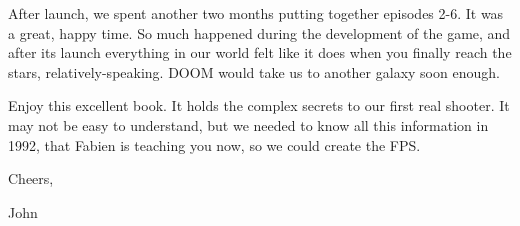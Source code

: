 \par
After launch, we spent another two months putting together episodes 2-6. It was a great, happy time. So much happened during the development of the game, and after its launch everything in our world felt like it does when you finally reach the stars, relatively-speaking. DOOM would take us to another galaxy soon enough.\\
\par
Enjoy this excellent book. It holds the complex secrets to our first real shooter. It may not be easy to understand, but we needed to know all this information in 1992, that Fabien is teaching you now, so we could create the FPS.\\
\par
Cheers,\\
\par
John
\thispagestyle{plain} %